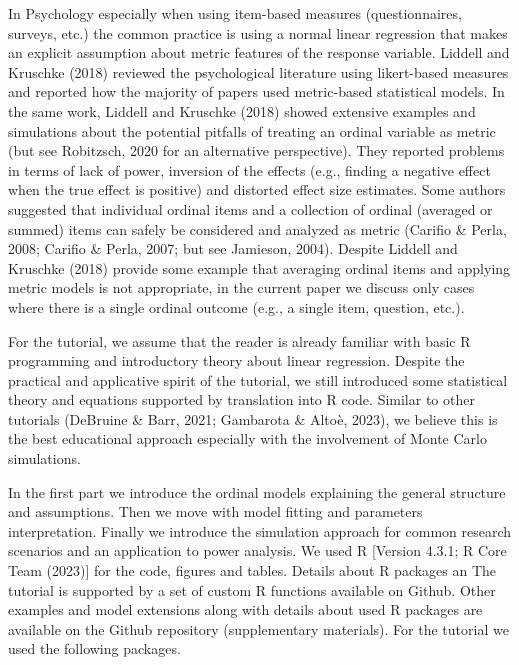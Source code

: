 \documentclass[
  man, mask,floatsintext]{apa6}
\begin{document}
In Psychology especially when using item-based measures (questionnaires, surveys, etc.) the common practice is using a normal linear regression that makes an explicit assumption about metric features of the response variable. Liddell and Kruschke (2018) reviewed the psychological literature using likert-based measures and reported how the majority of papers used metric-based statistical models. In the same work, Liddell and Kruschke (2018) showed extensive examples and simulations about the potential pitfalls of treating an ordinal variable as metric (but see Robitzsch, 2020 for an alternative perspective). They reported problems in terms of lack of power, inversion of the effects (e.g., finding a negative effect when the true effect is positive) and distorted effect size estimates. Some authors suggested that individual ordinal items and a collection of ordinal (averaged or summed) items can safely be considered and analyzed as metric (Carifio \& Perla, 2008; Carifio \& Perla, 2007; but see Jamieson, 2004). Despite Liddell and Kruschke (2018) provide some example that averaging ordinal items and applying metric models is not appropriate, in the current paper we discuss only cases where there is a single ordinal outcome (e.g., a single item, question, etc.).

For the tutorial, we assume that the reader is already familiar with basic R programming and introductory theory about linear regression. Despite the practical and applicative spirit of the tutorial, we still introduced some statistical theory and equations supported by translation into R code. Similar to other tutorials (DeBruine \& Barr, 2021; Gambarota \& Altoè, 2023), we believe this is the best educational approach especially with the involvement of Monte Carlo simulations.

In the first part we introduce the ordinal models explaining the general structure and assumptions. Then we move with model fitting and parameters interpretation. Finally we introduce the simulation approach for common research scenarios and an application to power analysis. We used R {[}Version 4.3.1; R Core Team (2023){]} for the code, figures and tables. Details about R packages an The tutorial is supported by a set of custom R functions available on Github. Other examples and model extensions along with details about used R packages are available on the Github repository (supplementary materials). For the tutorial we used the following packages.

\scriptsize

\normalsize
\end{document}
